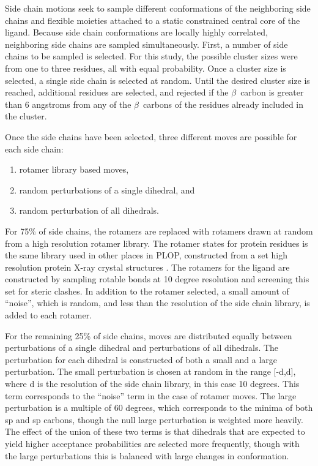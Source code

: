 Side chain motions seek to sample different conformations of the neighboring side chains and flexible moieties attached to a static constrained central core of the ligand.
Because side chain conformations are locally highly correlated, neighboring side chains are sampled simultaneously.
First, a number of side chains to be sampled is selected.
For this study, the possible cluster sizes were from one to three residues, all with equal probability.
Once a cluster size is selected, a single side chain is selected at random.
Until the desired cluster size is reached, additional residues are selected, and rejected if the $\beta$\ carbon is greater than 6 angstroms from any of the $\beta$\ carbons of the residues already included in the cluster.

Once the side chains have been selected, three different moves are possible for each side chain:
\begin{enumerate}
\item rotamer library based moves,
\item random perturbations of a single dihedral, and
\item random perturbation of all dihedrals.
\end{enumerate}

For 75\% of side chains, the rotamers are replaced with rotamers drawn at random from a high resolution rotamer library.
The rotamer states for protein residues is the same library used in other places in PLOP, constructed from a set high resolution protein X-ray crystal structures \cite{xiang2001extending}.
The rotamers for the ligand are constructed by sampling rotable bonds at 10 degree resolution and screening this set for steric clashes.
In addition to the rotamer selected, a small amount of ``noise'', which is random, and less than the resolution of the side chain library, is added to each rotamer.

For the remaining 25\% of side chains, moves are distributed equally between perturbations of a single dihedral and perturbations of all dihedrals.
The perturbation for each dihedral is constructed of both a small and a large perturbation.
The small perturbation is chosen at random in the range [-d,d], where d is the resolution of the side chain library, in this case 10 degrees.
This term corresponds to the ``noise'' term in the case of rotamer moves.
The large perturbation is a multiple of 60 degrees, which corresponds to the minima of both sp and sp carbons, though the null large perturbation is weighted more heavily.
The effect of the union of these two terms is that dihedrals that are expected to yield higher acceptance probabilities are selected more frequently, though with the large perturbations this is balanced with large changes in conformation.

